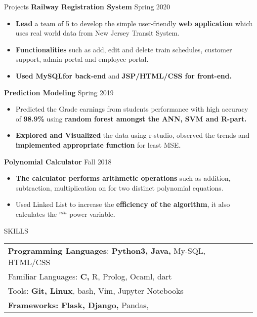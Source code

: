 \documentclass{resume}
\begin{document}
\begin{rSection}{Projects}
\textbf{Railway Registration System} \hfill Spring 2020
 \begin{itemize}
    \itemsep -3pt {} 
     \item {\bf Lead} a team of 5 to develop the simple user-friendly {\bf web application} which uses real world data from New Jersey Transit System.
    \item {\bf Functionalities} such as add, edit and delete train schedules, customer support,        admin portal and employee portal.
    \item {\bf Used MySQLfor back-end} and {\bf JSP/HTML/CSS for front-end.} 

 \end{itemize}
\textbf{Prediction Modeling} \hfill Spring 2019
 \begin{itemize}
    \itemsep -2pt {} 
     \item Predicted the Grade earnings from students performance with high accuracy of {\bf98.9\% } using {\bf random forest amongst the ANN, SVM and R-part.}
     \item {\bf Explored and Visualized} the data using r-studio, observed the trends and {\bf implemented appropriate function } for least MSE. 
 \end{itemize}
 
 \textbf{Polynomial Calculator} \hfill Fall 2018
 \begin{itemize}
    \itemsep -2pt {} 
     \item {\bf The calculator performs arithmetic operations} such as addition, subtraction,
           multiplication on for two distinct polynomial equations. 
     \item Used Linked List to increase the {\bf efficiency of the algorithm}, it also calculates the  {\bfx $^{nth}$ power} variable.
 
 \end{itemize}

\end{rSection} 

\begin{rSection}{SKILLS}

\begin{tabular}{ @{}  @{\hspace{6ex}} l }
{\bf Programming Languages}: \textbf{ Python3, Java,} My-SQL, HTML/CSS\\
Familiar Languages: {\bf C,} R, Prolog, Ocaml, dart\\
Tools: {\bf Git, Linux}, bash, Vim, Jupyter Notebooks  \\
{\bf Frameworks: Flask, Django,} Pandas, 
\end{tabular}\\
\end{rSection}
\end{document}
